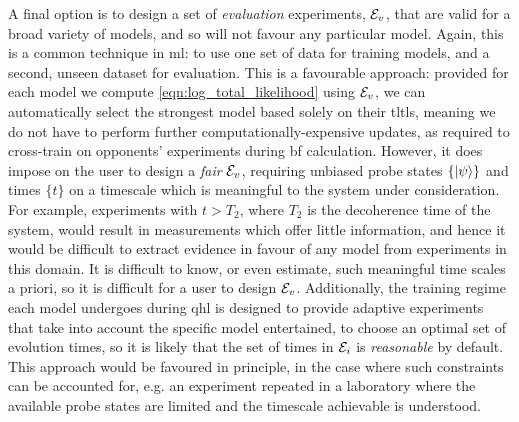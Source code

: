 A final option is to design a set of \emph{evaluation} \glspl{experiment}, ${ \mathcal{E} }_v$, 
    that are valid for a broad variety of models, and so will not favour any particular model.
Again, this is a common technique in \gls{ml}: to use one set of data for training models, 
    and a second, unseen dataset for evaluation. 
This is a favourable approach: 
    provided for each model we compute \cref{eqn:log_total_likelihood} using ${ \mathcal{E} }_v$,
    we can automatically select the strongest model based solely on their \glspl{tltl}, 
    meaning we do not have to perform further computationally-expensive updates, 
    as required to cross-train on opponents' 
    \glspl{experiment} during \gls{bf} calculation. 
However, it does impose on the user to design a \emph{fair} ${ \mathcal{E} }_v$, 
    requiring unbiased \gls{probe} states $\{\ket{\psi}\}$ and times $\{t\}$ on a timescale 
    which is meaningful to the system under consideration. 
For example, \glspl{experiment} with $t > T_2$, where $T_2$ is the decoherence time of the system, 
    would result in measurements which offer little information, 
    and hence it would be difficult to extract evidence in favour of any 
    model from \glspl{experiment} in this domain.
It is difficult to know, or even estimate, such meaningful time scales a priori,
    so it is difficult for a user to design ${ \mathcal{E} }_v$. 
Additionally, the training regime each model undergoes during \gls{qhl}
    is designed to provide adaptive \glspl{experiment} that take into account
    the specific model entertained, to choose an optimal set of evolution times, 
    so it is likely that the set of times in ${ \mathcal{E} }_i$ is \emph{reasonable} by default. 
This approach would be favoured in principle, in the case where such constraints can be accounted for,
    e.g. an \gls{experiment} repeated in a laboratory where the available 
    \gls{probe} states are limited and the timescale achievable is understood. 
     
